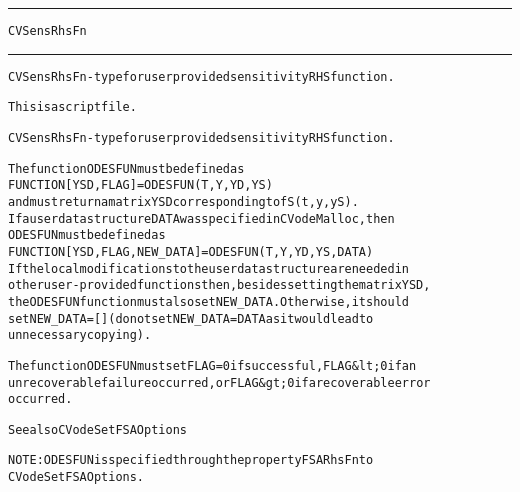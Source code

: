 \begin{samepage}
\hrule
\begin{center}
{\large \verb!CVSensRhsFn!}
\label{p:CVSensRhsFn}
\end{center}
\hrule\vspace{0.1in}



\begin{alltt}
CVSensRhsFn - type for user provided sensitivity RHS function.
\end{alltt}

\end{samepage}



\begin{samepage}


\begin{alltt}
This is a script file. 
\end{alltt}

\end{samepage}



\begin{alltt}
CVSensRhsFn - type for user provided sensitivity RHS function.

   The function ODESFUN must be defined as 
        FUNCTION [YSD, FLAG] = ODESFUN(T,Y,YD,YS)
   and must return a matrix YSD corresponding to fS(t,y,yS).
   If a user data structure DATA was specified in CVodeMalloc, then
   ODESFUN must be defined as
        FUNCTION [YSD, FLAG, NEW_DATA] = ODESFUN(T,Y,YD,YS,DATA)
   If the local modifications to the user data structure are needed in
   other user-provided functions then, besides setting the matrix YSD,
   the ODESFUN function must also set NEW_DATA. Otherwise, it should
   set NEW_DATA=[] (do not set NEW_DATA = DATA as it would lead to 
   unnecessary copying).

   The function ODESFUN must set FLAG=0 if successful, FLAG&lt;0 if an
   unrecoverable failure occurred, or FLAG&gt;0 if a recoverable error
   occurred.

   See also CVodeSetFSAOptions

   NOTE: ODESFUN is specified through the property FSARhsFn to
         CVodeSetFSAOptions.
\end{alltt}






\vspace{0.1in}